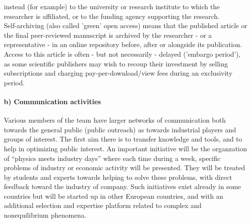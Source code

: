 {\begin{compactitem}
    instead (for example) to the university or research institute to which the
    researcher is affiliated, or to the funding agency supporting the research.\\
%
    Self-archiving (also called 'green' open access) means that the published
    article or the final peer-reviewed manuscript is archived by the researcher
    - or a representative - in an online repository before, after or alongside
    its publication.  Access to this article is often - but not necessarily -
    delayed ('embargo period'), as some scientific publishers may wish to recoup
    their investment by selling subscriptions and charging pay-per-download/view
    fees during an exclusivity period.
%
  \end{compactitem}
}

\paragraph{b) Communication activities}


Various members of the team have larger networks of communication both towards the general public (public outreach) as towards industrial players and groups of interest.  The first aim there is to transfer knowledge and tools, and to help in optimizing public interest. An important initiative will be the organzation of ``physics meets industry days''
where each time during a week, specific problems of industry or economic activity will be presented.  They will be treated by students and experts towards helping to solve these problems, with direct feedback toward the industry of company.  Such initiatives exist already in some countries but will be started up in other European countries, and with an additional selection and expertise platform related to complex and nonequilibrium phenomena.



